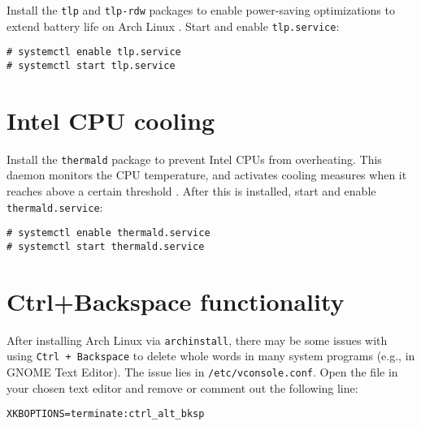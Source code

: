 \documentclass[a4paper]{article}
\begin{document}
Install the \lstinline|tlp| and \lstinline|tlp-rdw| packages to enable power-saving optimizations to extend battery life on Arch Linux \cite{tlp-installation}.
Start and enable \lstinline|tlp.service|:
\begin{lstlisting}
# systemctl enable tlp.service
# systemctl start tlp.service
\end{lstlisting}


\section{Intel CPU cooling}

Install the \lstinline|thermald| package to prevent Intel CPUs from overheating.
This daemon monitors the CPU temperature, and activates cooling measures when it reaches above a certain threshold \cite{arch-wiki-thermald}.
After this is installed, start and enable \lstinline|thermald.service|:
\begin{lstlisting}
# systemctl enable thermald.service
# systemctl start thermald.service
\end{lstlisting}


\section{Ctrl+Backspace functionality}

After installing Arch Linux via \lstinline|archinstall|, there may be some issues with using \lstinline|Ctrl + Backspace| to delete whole words in many system programs (e.g., in GNOME Text Editor).
The issue lies in \lstinline|/etc/vconsole.conf|.
Open the file in your chosen text editor and remove or comment out the following line:
\begin{lstlisting}
XKBOPTIONS=terminate:ctrl_alt_bksp
\end{lstlisting}
\end{document}
